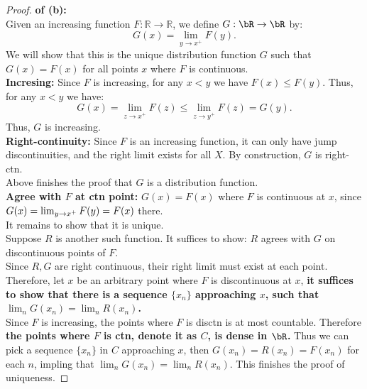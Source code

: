 \documentclass[lang=cn,11pt]{elegantbook}
\begin{document}
\begin{proof} \textbf{of (b):}\\
Given an increasing function \( F: \mathbb{R} \to \mathbb{R} \), we define $G:\bR \rar \bR$ by:
\[
G(x) = \lim_{y \to x^+} F(y).
\]
We will show that this is the unique distribution function $G$ such that $G(x)=F(x)$ for all points $x$ where $F$ is continuous.\\
\textbf{Incresing:} Since \( F \) is increasing, for any \( x < y \) we have \( F(x) \le F(y) \). Thus, for any \( x < y \) we have:
\[
G(x) = \lim_{z \to x^+} F(z) \le \lim_{z \to y^+} F(z) = G(y).
\]
Thus, \( G \) is increasing.\\
\textbf{Right-continuity:} Since $F$ is an increasing function, it can only have jump discontinuities, and the right limit exists for all $X$. By construction, $G$ is right-ctn.\\
Above finishes the proof that $G$ is a distribution function.\\
\textbf{Agree with $F$ at ctn point:} $G(x) = F(x)$ where $F$ is continuous at $x$, since $G(x) = \lim_{y\rightarrow x^+} F(y) = F(x) $ there.\\

It remains to show that it is unique.\\
Suppose $R$ is another such function. It suffices to show: $R $ agrees with $G$ on discontinuous points of $F$.\\
Since $R,G$ are right continuous, their right limit must exist at each point. Therefore, let $x$ be an arbitrary point where $F$ is discontinuous at $x$, \textbf{it suffices to show that there is a sequence $\{x_n\}$ approaching $x$, such that $\lim_n G(x_n)  = \lim_n R(x_n)$.}\\
Since $F$ is increasing, the points where $F$ is disctn is at most countable. Therefore\textbf{ the points where $F$ is ctn, denote it as $C$, is dense in $\bR$.} Thus we can pick a sequence $\{x_n\}$ in $C$ approaching $x$, then $G(x_n) = R(x_n) = F(x_n)$ for each $n$, impling that $\lim_n G(x_n)  = \lim_n R(x_n)$. This finishes the proof of uniqueness.

\end{proof}



\begin{comment}
Claim 1: 任何 $F: \bR \rar \bR$ 如果是 increasing 的, 它的不连续点一定可数. 从而连续点一定稠密. 
假设 R(x) 是一个在连续点上和 F(x) 相同的 distribution function. Take arbitrary $y$ where F is not ctn on $Y$.
\end{comment}
\end{document}
